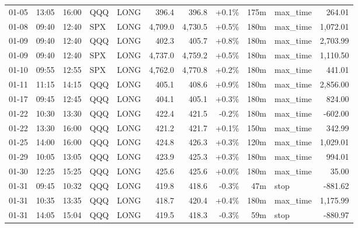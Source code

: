 \documentclass[11pt,a4paper,twoside]{article}
\begin{document}
\begin{center}
\begin{longtable}{>{\color{txtmain}}l l l l l r r r r >{\color{txtmain}}l r}
01-05 & 13:05 & 16:00 & QQQ & LONG & 396.4 & 396.8 & \textcolor{wingreen}{+0.1\%} & 175m & max\_time & \textcolor{wingreen}{264.01} \\
01-08 & 09:40 & 12:40 & SPX & LONG & 4,709.0 & 4,730.5 & \textcolor{wingreen}{+0.5\%} & 180m & max\_time & \textcolor{wingreen}{1,072.01} \\
01-09 & 09:40 & 12:40 & QQQ & LONG & 402.3 & 405.7 & \textcolor{wingreen}{+0.8\%} & 180m & max\_time & \textcolor{wingreen}{2,703.99} \\
01-09 & 09:40 & 12:40 & SPX & LONG & 4,737.0 & 4,759.2 & \textcolor{wingreen}{+0.5\%} & 180m & max\_time & \textcolor{wingreen}{1,110.50} \\
01-10 & 09:55 & 12:55 & SPX & LONG & 4,762.0 & 4,770.8 & \textcolor{wingreen}{+0.2\%} & 180m & max\_time & \textcolor{wingreen}{441.01} \\
01-11 & 11:15 & 14:15 & QQQ & LONG & 405.1 & 408.6 & \textcolor{wingreen}{+0.9\%} & 180m & max\_time & \textcolor{wingreen}{2,856.00} \\
01-17 & 09:45 & 12:45 & QQQ & LONG & 404.1 & 405.1 & \textcolor{wingreen}{+0.3\%} & 180m & max\_time & \textcolor{wingreen}{824.00} \\
01-22 & 10:30 & 13:30 & QQQ & LONG & 422.4 & 421.5 & \textcolor{lossred}{-0.2\%} & 180m & max\_time & \textcolor{lossred}{-602.00} \\
01-22 & 13:30 & 16:00 & QQQ & LONG & 421.2 & 421.7 & \textcolor{wingreen}{+0.1\%} & 150m & max\_time & \textcolor{wingreen}{342.99} \\
01-25 & 14:00 & 16:00 & QQQ & LONG & 424.8 & 426.3 & \textcolor{wingreen}{+0.3\%} & 120m & max\_time & \textcolor{wingreen}{1,029.01} \\
01-29 & 10:05 & 13:05 & QQQ & LONG & 423.9 & 425.3 & \textcolor{wingreen}{+0.3\%} & 180m & max\_time & \textcolor{wingreen}{994.01} \\
01-30 & 12:25 & 15:25 & QQQ & LONG & 425.6 & 425.6 & \textcolor{wingreen}{+0.0\%} & 180m & max\_time & \textcolor{wingreen}{35.00} \\
01-31 & 09:45 & 10:32 & QQQ & LONG & 419.8 & 418.6 & \textcolor{lossred}{-0.3\%} & 47m & stop & \textcolor{lossred}{-881.62} \\
01-31 & 10:35 & 13:35 & QQQ & LONG & 418.7 & 420.4 & \textcolor{wingreen}{+0.4\%} & 180m & max\_time & \textcolor{wingreen}{1,175.99} \\
01-31 & 14:05 & 15:04 & QQQ & LONG & 419.5 & 418.3 & \textcolor{lossred}{-0.3\%} & 59m & stop & \textcolor{lossred}{-880.97} \\

\end{longtable}
\end{center}
\end{document}
